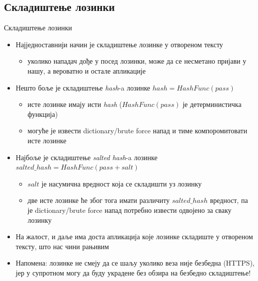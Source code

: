 \documentclass[aspectratio=169]{beamer}
\begin{document}
    \subsection[]{Складиштење лозинки}
    
    \begin{frame}[allowframebreaks]{Складиштење лозинки}
        \begin{itemize}
            \item Најједноставнији начин је складиштење лозинке у отвореном тексту
            \begin{itemize}
                \item уколико нападач дође у посед лозинки, може да се несметано пријави у нашу, а вероватно и остале апликације
            \end{itemize}
            \item Нешто боље је складиштење \textit{hash}-a лозинке \begin{math}hash = HashFunc(pass)\end{math}
            \begin{itemize}
                \item исте лозинке имају исти \textit{hash} (\begin{math}HashFunc(pass)\end{math} је детерминистичка функција)
                \item могуће је извести dictionary/brute force напад и тиме компоромитовати исте лозинке
            \end{itemize}
            
            \framebreak
            
            \item Најбоље је складиштење \textit{salted hash}-a лозинке \begin{math}salted\_hash = HashFunc(pass + salt)\end{math}
            \begin{itemize}
                \item \begin{math}salt\end{math} је насумична вредност која се складишти уз лозинку
                \item две исте лозинке ће због тога имати различиту \begin{math}salted\_hash\end{math} вредност, па је dictionary/brute force напад потребно извести одвојено за сваку лозинку
            \end{itemize}
            \item На жалост, и даље има доста апликација које лозинке складиште у отвореном тексту, што нас чини рањивим
            \item Напомена: лозинке не смеју да се шаљу уколико веза није безбедна (HTTPS), јер у супротном могу да буду украдене без обзира на безбедно складиштење!
            

\end{itemize}
\end{frame}
\end{document}
